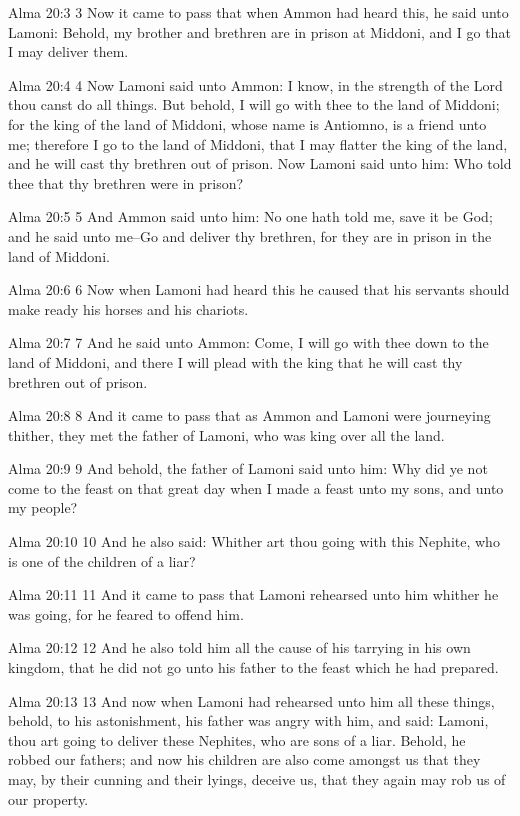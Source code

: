 Alma 20:3
 3 Now it came to pass that when Ammon had heard this, he said
unto Lamoni: Behold, my brother and brethren are in prison at
Middoni, and I go that I may deliver them.

Alma 20:4
 4 Now Lamoni said unto Ammon: I know, in the strength of the
Lord thou canst do all things. But behold, I will go with thee
to the land of Middoni; for the king of the land of Middoni,
whose name is Antiomno, is a friend unto me; therefore I go to
the land of Middoni, that I may flatter the king of the land, and
he will cast thy brethren out of prison. Now Lamoni said unto
him: Who told thee that thy brethren were in prison?

Alma 20:5
 5 And Ammon said unto him: No one hath told me, save it be God;
and he said unto me--Go and deliver thy brethren, for they are in
prison in the land of Middoni.

Alma 20:6
 6 Now when Lamoni had heard this he caused that his servants
should make ready his horses and his chariots.

Alma 20:7
 7 And he said unto Ammon: Come, I will go with thee down to the
land of Middoni, and there I will plead with the king that he
will cast thy brethren out of prison.

Alma 20:8
 8 And it came to pass that as Ammon and Lamoni were journeying
thither, they met the father of Lamoni, who was king over all the
land.

Alma 20:9
 9 And behold, the father of Lamoni said unto him: Why did ye not
come to the feast on that great day when I made a feast unto my
sons, and unto my people?

Alma 20:10
 10 And he also said: Whither art thou going with this Nephite,
who is one of the children of a liar?

Alma 20:11
 11 And it came to pass that Lamoni rehearsed unto him whither he
was going, for he feared to offend him.

Alma 20:12
 12 And he also told him all the cause of his tarrying in his own
kingdom, that he did not go unto his father to the feast which he
had prepared.

Alma 20:13
 13 And now when Lamoni had rehearsed unto him all these things,
behold, to his astonishment, his father was angry with him, and
said: Lamoni, thou art going to deliver these Nephites, who are
sons of a liar. Behold, he robbed our fathers; and now his
children are also come amongst us that they may, by their cunning
and their lyings, deceive us, that they again may rob us of our
property.

